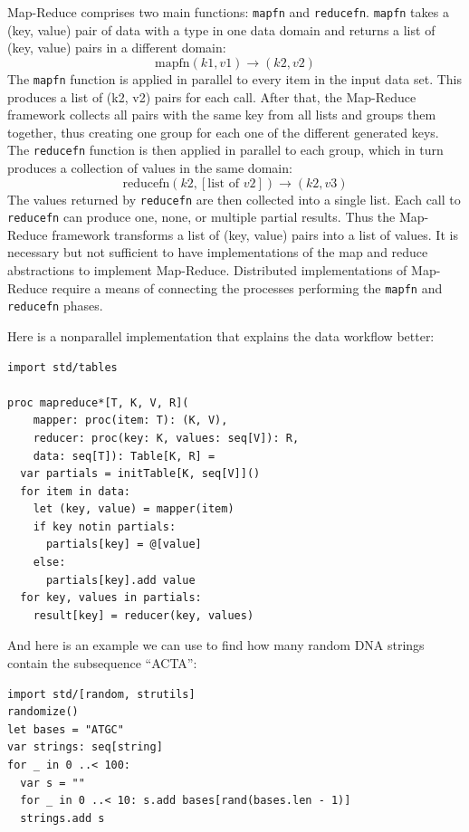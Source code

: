 \documentclass[justified, sixbynine]{tufte-book}
\def\ft{\small\tt}
\theoremstyle{plain}%
\newtheorem * {corollary}{Corollary}
\theoremstyle{definition}
\theoremstyle{remark}
\newtheorem * {remark}{Remark}
\newtheorem * {note}{Note}
\begin{document}
\begin{fullwidth}
Map-Reduce comprises two main functions: {\ft mapfn} and {\ft reducefn}. {\ft mapfn} takes a (key, value) pair of data with a type in one data domain and returns a list of (key, value) pairs in a different domain:
\begin{equation}
\textrm{mapfn}(k1, v1) \rightarrow (k2, v2)
\end{equation}
The {\ft mapfn} function is applied in parallel to every item in the input data set. This produces a list of (k2, v2) pairs for each call. After that, the Map-Reduce framework collects all pairs with the same key from all lists and groups them together, thus creating one group for each one of the different generated keys.
The {\ft reducefn} function is then applied in parallel to each group, which in turn produces a collection of values in the same domain:
\begin{equation}
\textrm{reducefn}(k2, [\textrm{list of }v2]) \rightarrow (k2, v3)
\end{equation}
The values returned by {\ft reducefn} are then collected into a single list. Each call to {\ft reducefn} can produce one, none, or multiple partial results.
Thus the Map-Reduce framework transforms a list of (key, value) pairs into a list of values.
It is necessary but not sufficient to have implementations of the map and reduce abstractions to implement Map-Reduce. Distributed implementations of Map-Reduce require a means of connecting the processes performing the {\ft mapfn} and {\ft reducefn} phases.

Here is a nonparallel implementation that explains the data workflow better:

\begin{lstlisting}[caption={in file: {\ft mapreduce.nim}}]
import std/tables

proc mapreduce*[T, K, V, R](
    mapper: proc(item: T): (K, V),
    reducer: proc(key: K, values: seq[V]): R,
    data: seq[T]): Table[K, R] =
  var partials = initTable[K, seq[V]]()
  for item in data:
    let (key, value) = mapper(item)
    if key notin partials:
      partials[key] = @[value]
    else:
      partials[key].add value
  for key, values in partials:
    result[key] = reducer(key, values)
\end{lstlisting}

And here is an example we can use to find how many random DNA strings contain the subsequence ``ACTA'':

\begin{lstlisting}
import std/[random, strutils]
randomize()
let bases = "ATGC"
var strings: seq[string]
for _ in 0 ..< 100:
  var s = ""
  for _ in 0 ..< 10: s.add bases[rand(bases.len - 1)]
  strings.add s


\end{lstlisting}
\end{fullwidth}
\end{document}
